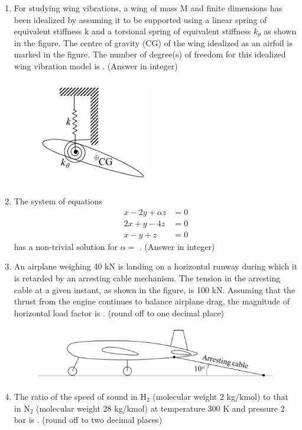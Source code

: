 \documentclass{article}
\begin{document}
\begin{enumerate}[leftmargin=*, resume]
\item For studying wing vibrations, a wing of mass M and finite dimensions has been idealized by assuming it to be supported using a linear spring of equivalent stiffness k and a torsional spring of equivalent stiffness $k_\theta$ as shown in the figure. The centre of gravity (CG) of the wing idealized as an airfoil is marked in the figure. The number of degree(s) of freedom for this idealized wing vibration model is \underline{\hspace{1.5cm}}. (Answer in integer)
\begin{figure}[H]
    \centering
    \includegraphics[width=0.3\linewidth]{figs/q30.png}
    \caption{}
    \label{fig:q30}
\end{figure}

\item The system of equations 
\begin{align*}
x - 2y + \alpha z &= 0 \\
2x + y - 4z &= 0 \\
x - y + z &= 0
\end{align*}
has a non-trivial solution for $\alpha =$ \underline{\hspace{1.5cm}}. (Answer in integer)

\item An airplane weighing 40 kN is landing on a horizontal runway during which it is retarded by an arresting cable mechanism. The tension in the arresting cable at a given instant, as shown in the figure, is 100 kN. Assuming that the thrust from the engine continues to balance airplane drag, the magnitude of horizontal load factor is \underline{\hspace{1.5cm}}. (round off to one decimal place)
\begin{figure}[H]
    \centering
    \includegraphics[width=0.3\linewidth]{figs/q32.png}
    \caption{}
    \label{fig:q32}
\end{figure}

\item The ratio of the speed of sound in H$_2$ (molecular weight 2 kg/kmol) to that in N$_2$ (molecular weight 28 kg/kmol) at temperature 300 K and pressure 2 bar is \underline{\hspace{1.5cm}}. (round off to two decimal places)


\end{enumerate}
\end{document}
